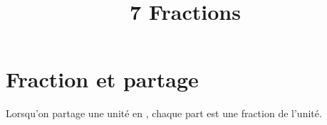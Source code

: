 \documentclass[12pt,a4paper]{article}
\date{}
\title{\textcircled{{\normalsize{7}}} Fractions}
\begin{document}
	
	\maketitle






\section{Fraction et partage}


\begin{mydef}
	Lorsqu'on partage une unité en , chaque part est une fraction de l'unité.
\end{mydef}
\end{document}
